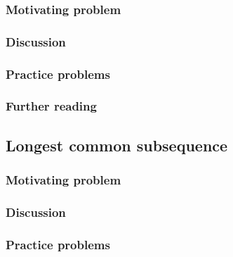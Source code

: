 \subsubsection*{Motivating problem}







\subsubsection*{Discussion}

\subsubsection*{Practice problems}

\subsubsection*{Further reading}

\subsection{Longest common subsequence}

\subsubsection*{Motivating problem}







\subsubsection*{Discussion}

\subsubsection*{Practice problems}

